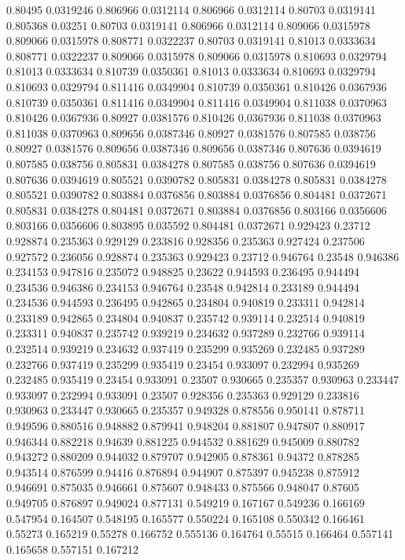 0.80495 0.0319246
0.806966 0.0312114
0.806966 0.0312114
0.80703 0.0319141
0.805368 0.03251
0.80703 0.0319141
0.806966 0.0312114
0.809066 0.0315978
0.809066 0.0315978
0.808771 0.0322237
0.80703 0.0319141
0.81013 0.0333634
0.808771 0.0322237
0.809066 0.0315978
0.809066 0.0315978
0.810693 0.0329794
0.81013 0.0333634
0.810739 0.0350361
0.81013 0.0333634
0.810693 0.0329794
0.810693 0.0329794
0.811416 0.0349904
0.810739 0.0350361
0.810426 0.0367936
0.810739 0.0350361
0.811416 0.0349904
0.811416 0.0349904
0.811038 0.0370963
0.810426 0.0367936
0.80927 0.0381576
0.810426 0.0367936
0.811038 0.0370963
0.811038 0.0370963
0.809656 0.0387346
0.80927 0.0381576
0.807585 0.038756
0.80927 0.0381576
0.809656 0.0387346
0.809656 0.0387346
0.807636 0.0394619
0.807585 0.038756
0.805831 0.0384278
0.807585 0.038756
0.807636 0.0394619
0.807636 0.0394619
0.805521 0.0390782
0.805831 0.0384278
0.805831 0.0384278
0.805521 0.0390782
0.803884 0.0376856
0.803884 0.0376856
0.804481 0.0372671
0.805831 0.0384278
0.804481 0.0372671
0.803884 0.0376856
0.803166 0.0356606
0.803166 0.0356606
0.803895 0.035592
0.804481 0.0372671
0.929423 0.23712
0.928874 0.235363
0.929129 0.233816
0.928356 0.235363
0.927424 0.237506
0.927572 0.236056
0.928874 0.235363
0.929423 0.23712
0.946764 0.23548
0.946386 0.234153
0.947816 0.235072
0.948825 0.23622
0.944593 0.236495
0.944494 0.234536
0.946386 0.234153
0.946764 0.23548
0.942814 0.233189
0.944494 0.234536
0.944593 0.236495
0.942865 0.234804
0.940819 0.233311
0.942814 0.233189
0.942865 0.234804
0.940837 0.235742
0.939114 0.232514
0.940819 0.233311
0.940837 0.235742
0.939219 0.234632
0.937289 0.232766
0.939114 0.232514
0.939219 0.234632
0.937419 0.235299
0.935269 0.232485
0.937289 0.232766
0.937419 0.235299
0.935419 0.23454
0.933097 0.232994
0.935269 0.232485
0.935419 0.23454
0.933091 0.23507
0.930665 0.235357
0.930963 0.233447
0.933097 0.232994
0.933091 0.23507
0.928356 0.235363
0.929129 0.233816
0.930963 0.233447
0.930665 0.235357
0.949328 0.878556
0.950141 0.878711
0.949596 0.880516
0.948882 0.879941
0.948204 0.881807
0.947807 0.880917
0.946344 0.882218
0.94639 0.881225
0.944532 0.881629
0.945009 0.880782
0.943272 0.880209
0.944032 0.879707
0.942905 0.878361
0.94372 0.878285
0.943514 0.876599
0.94416 0.876894
0.944907 0.875397
0.945238 0.875912
0.946691 0.875035
0.946661 0.875607
0.948433 0.875566
0.948047 0.87605
0.949705 0.876897
0.949024 0.877131
0.549219 0.167167
0.549236 0.166169
0.547954 0.164507
0.548195 0.165577
0.550224 0.165108
0.550342 0.166461
0.55273 0.165219
0.55278 0.166752
0.555136 0.164764
0.55515 0.166464
0.557141 0.165658
0.557151 0.167212
